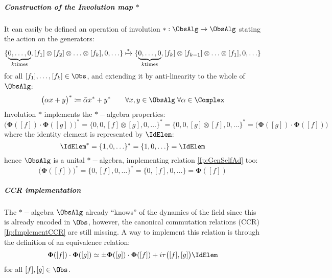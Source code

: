 \documentclass[Main]{subfiles}
\begin{document}
   			\subparagraph{Construction of the Involution map $*$}
	   			It can easily be defined an operation of involution $*:\ObsAlg \rightarrow \ObsAlg$ stating the action on the generators:
				\begin{displaymath}
					\{ \underbrace{0,\ldots, 0}_{k \textrm{times}}, [f_1]\otimes [f_2] \otimes \ldots \otimes [f_k],0,\ldots \}
					\xmapsto{*}
					\{ \underbrace{0,\ldots, 0}_{k \textrm{times}}, [f_k]\otimes [f_{k-1}] \otimes \ldots \otimes [f_1],0,\ldots \}
				\end{displaymath}
				for all $[f_1],\ldots,[f_k] \in \Obs$, and extending it by anti-linearity to the whole of $\ObsAlg$:
				\begin{displaymath}
					\big( \alpha x + y \big)^* \coloneqq \bar{\alpha} x^* + y^* \qquad \forall x,y\in \ObsAlg \; \forall \alpha \in \Complex
				\end{displaymath}
				Involution $*$ implements the $\ast-$algebra properties:
				\begin{equation}
					\big( \mathbf{\Phi}([f]) \cdot \mathbf{\Phi}([g]) \big)^* = \big\{0,0,[f]\otimes [g],0,\ldots \big\}^* =
					\big\{0,0,[g]\otimes [f],0,\ldots \big\}^* = \big( \mathbf{\Phi}([g]) \cdot \mathbf{\Phi}([f]) \big)	
				\end{equation}
				where the identity element is represented by $\IdElem$:
				\begin{equation}
				\IdElem^* = \{1,0,\ldots\}^* =\{1,0,\ldots\}= \IdElem
				\end{equation}
				hence $\ObsAlg$ is a unital $\ast-$algebra, implementing relation \ref{Ip:GenSelfAd} too:
				\begin{displaymath}
					\big(\mathbf{\Phi}([f])\big)^* = \big\{ 0, [f],0,\ldots\big\}^* = \big\{ 0, [f],0,\ldots\big\} = \mathbf{\Phi}([f])
				\end{displaymath}			
   			\subparagraph{CCR implementation}
				The $\ast-$algebra $\ObsAlg$ already “knows” of the dynamics of the field since this is already encoded in $\Obs$, however, the canonical commutation relations (CCR) \ref{Ip:ImplementCCR} are still missing. 
   		 		A way to implement this relation is through the definition of an equivalence relation:
   		 			\begin{equation}\label{Eq:EquiClass}
   		 				\mathbf{\Phi}([f]) \cdot \mathbf{\Phi}([g]) \simeq \pm \mathbf{\Phi}([g]) \cdot \mathbf{\Phi}([f]) + 
   		 				i \tau\big( [f], [g] \big) \IdElem
   		 			\end{equation}
   		 		for all $[f],[g] \in \Obs$.\\
\end{document}
